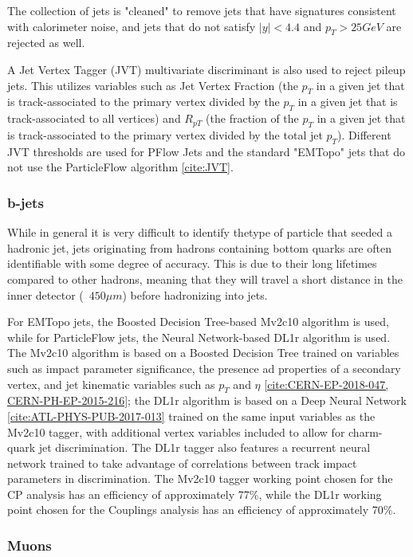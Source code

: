 The collection of jets is "cleaned" to remove jets that have signatures consistent with calorimeter noise, and jets that do not satisfy $|y| < 4.4$ and $p_{T} > 25 GeV$ are rejected as well. 

A Jet Vertex Tagger (JVT) multivariate discriminant is also used to reject pileup jets. This utilizes variables such as Jet Vertex Fraction (the $p_{T}$ in a given jet that is track-associated to the primary vertex divided by the $p_{T}$ in a given jet that is track-associated to all vertices) and $R_{pT}$ (the fraction of the $p_{T}$ in a given jet that is track-associated to the primary vertex divided by the total jet $p_{T}$). Different JVT thresholds are used for PFlow Jets and the standard "EMTopo" jets that do not use the ParticleFlow algorithm \ref{cite:JVT}.

\subsubsection{b-jets} \label{sec:b-jets} 

While in general it is very difficult to identify thetype of particle that seeded a hadronic jet, jets originating from hadrons containing bottom quarks are often identifiable with some degree of accuracy. This is due to their long lifetimes compared to other hadrons, meaning that they will travel a short distance in the inner detector (~$450 \mu m$) before hadronizing into jets. 

For EMTopo jets, the Boosted Decision Tree-based Mv2c10 algorithm is used, while for ParticleFlow jets, the Neural Network-based DL1r algorithm is used. The Mv2c10 algorithm is based on a Boosted Decision Tree trained on variables such as impact parameter significance, the presence ad properties of a secondary vertex, and jet kinematic variables such as $p_{T}$ and $\eta$ \ref{cite:CERN-EP-2018-047, CERN-PH-EP-2015-216}; the DL1r algorithm is based on a Deep Neural Network \ref{cite:ATL-PHYS-PUB-2017-013} trained on the same input variables as the Mv2c10 tagger, with additional vertex variables included to allow for charm-quark jet discrimination. The DL1r tagger also features a recurrent neural network trained to take advantage of correlations between track impact parameters in discrimination. The Mv2c10 tagger working point chosen for the CP analysis has an efficiency of approximately 77$\%$, while the DL1r working point chosen for the Couplings analysis has an efficiency of approximately 70$\%$.  

\subsubsection{Muons} \label{sec:Muons} 

